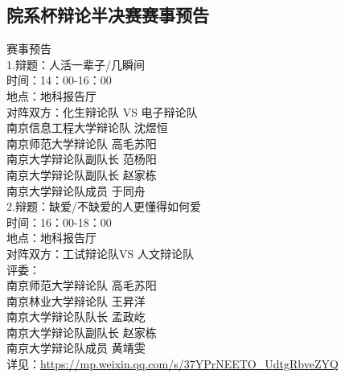 \documentclass[letterpaper, 12pt]{article}
\begin{document}
\begin{multicols}{2}
\subsection{院系杯辩论半决赛赛事预告}
赛事预告
\\1.辩题：人活一辈子/几瞬间
\\时间：14：00-16：00
\\地点：地科报告厅
\\对阵双方：化生辩论队 VS 电子辩论队
\\南京信息工程大学辩论队 沈煜恒
\\南京师范大学辩论队 高毛苏阳
\\南京大学辩论队副队长 范杨阳
\\南京大学辩论队副队长 赵家栋
\\南京大学辩论队成员 于同舟
\\2.辩题：缺爱/不缺爱的人更懂得如何爱
\\时间：16：00-18：00
\\地点：地科报告厅
\\对阵双方：工试辩论队VS 人文辩论队
\\评委：
\\南京师范大学辩论队 高毛苏阳
\\南京林业大学辩论队 王昇洋
\\南京大学辩论队队长 孟政屹
\\南京大学辩论队副队长 赵家栋
\\南京大学辩论队成员 黄靖雯
\\详见：\url{https://mp.weixin.qq.com/s/37YPrNEETO_UdtgRbveZYQ}


\end{multicols}
\end{document}
